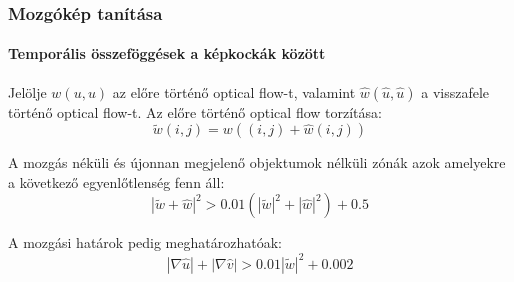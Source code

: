 \documentclass{beamer}
\begin{document}
	\begin{frame}
		\frametitle{Mozgókép tanítása}
		\framesubtitle{Temporális összeföggések a képkockák között}
		
		Jelölje \(w(u, u)\) az előre történő optical flow-t, valamint \(\hat{w}(\hat{u}, \hat{u})\) a visszafele történő optical flow-t. Az előre történő optical flow torzítása:
		\begin{equation}
			\tilde{w}(i, j) = w((i, j) + \hat{w}(i, j))
		\end{equation}
		
		A mozgás néküli és újonnan megjelenő objektumok nélküli zónák azok amelyekre a következő egyenlőtlenség fenn áll:
		\begin{equation} \label{eq:1}
			|\tilde{w} + \hat{w}|^2 > 0.01(|\tilde{w}|^2 + |\hat{w}|^2) + 0.5
		\end{equation}
		
		A mozgási határok pedig meghatározhatóak:
		\begin{equation} \label{eq:2}
			|\nabla\hat{u}| + |\nabla\hat{v}| > 0.01|\tilde{w}|^2 + 0.002
		\end{equation}
		
		\begin{figure}[!htbp]
			\centering
			\hspace{0mm}
			\label{consistency_weights}
		\end{figure}
		
	\end{frame}
\end{document}

